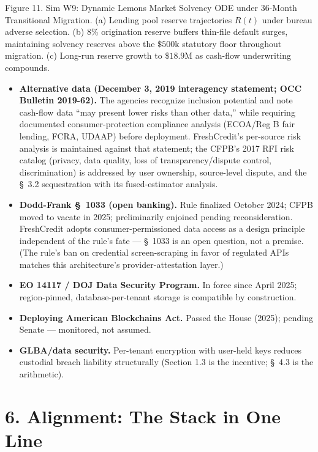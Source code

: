 \documentclass[
]{article}
\begin{document}
Figure 11. Sim W9: Dynamic Lemons Market Solvency ODE under 36-Month
Transitional Migration. (a) Lending pool reserve trajectories \(R(t)\)
under bureau adverse selection. (b) 8\% origination reserve buffers
thin-file default surges, maintaining solvency reserves above the
\(\$500\text{k}\) statutory floor throughout migration. (c) Long-run
reserve growth to \(\$18.9\text{M}\) as cash-flow underwriting
compounds.

\begin{itemize}
\item
  \textbf{Alternative data (December 3, 2019 interagency statement; OCC
  Bulletin 2019-62).} The agencies recognize inclusion potential and
  note cash-flow data ``may present lower risks than other data,'' while
  requiring documented consumer-protection compliance analysis (ECOA/Reg
  B fair lending, FCRA, UDAAP) before deployment. FreshCredit's
  per-source risk analysis is maintained against that statement; the
  CFPB's 2017 RFI risk catalog (privacy, data quality, loss of
  transparency/dispute control, discrimination) is addressed by user
  ownership, source-level dispute, and the §~3.2 sequestration with its
  fused-estimator analysis.
\item
  \textbf{Dodd-Frank §~1033 (open banking).} Rule finalized October
  2024; CFPB moved to vacate in 2025; preliminarily enjoined pending
  reconsideration. FreshCredit adopts consumer-permissioned data access
  as a design principle independent of the rule's fate --- §~1033 is an
  open question, not a premise. (The rule's ban on credential
  screen-scraping in favor of regulated APIs matches this architecture's
  provider-attestation layer.)
\item
  \textbf{EO 14117 / DOJ Data Security Program.} In force since April
  2025; region-pinned, database-per-tenant storage is compatible by
  construction.
\item
  \textbf{Deploying American Blockchains Act.} Passed the House (2025);
  pending Senate --- monitored, not assumed.
\item
  \textbf{GLBA/data security.} Per-tenant encryption with user-held keys
  reduces custodial breach liability structurally (Section 1.3 is the
  incentive; §~4.3 is the arithmetic).
\end{itemize}

\section{6. Alignment: The Stack in One
Line}\label{alignment-the-stack-in-one-line}
\end{document}

